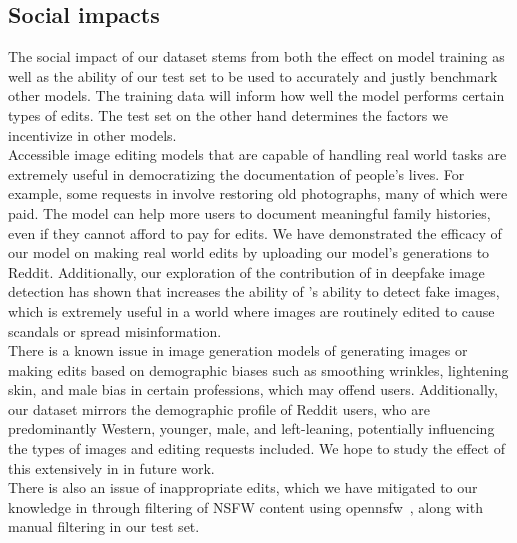 \subsection{Social impacts}
The social impact of our dataset stems from both the effect on model training as well as the ability of our test set to be used to accurately and justly benchmark other models. The training data will inform how well the \ours model performs certain types of edits. The test set on the other hand determines the factors we incentivize in other models. \\
Accessible image editing models that are capable of handling real world tasks are extremely useful in democratizing the documentation of people's lives. For example, some requests in \ours involve restoring old photographs, many of which were paid. The \ours model can help more users to document meaningful family histories, even if they cannot afford to pay for edits. We have demonstrated the efficacy of our model on making real world edits by uploading our model's generations to Reddit. Additionally, our exploration of the contribution of \ours in deepfake image detection has shown that \ours increases the ability of \truemedia's ability to detect fake images, which is extremely useful in a world where images are routinely edited to cause scandals or spread misinformation. \\
There is a known issue in image generation models of generating images or making edits based on demographic biases such as smoothing wrinkles, lightening skin, and male bias in certain professions, which may offend users. Additionally, our dataset mirrors the demographic profile of Reddit users, who are predominantly Western, younger, male, and left-leaning, potentially influencing the types of images and editing requests included. We hope to study the effect of this extensively in \ours in future work.\\
There is also an issue of inappropriate edits, which we have mitigated to our knowledge in \ours through filtering of NSFW content using opennsfw~\cite{bhky_opennsfw2}, along with manual filtering in our test set. \\

